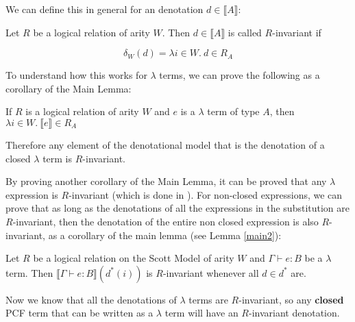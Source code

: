 We can define this in general for an denotation $d \in \llbracket A \rrbracket$:

\vspace{0.5cm}

\begin{defn}{\citep{Streicher06}}Let $R$ be a logical relation of arity $W$. Then $d \in \llbracket A \rrbracket$ is called $R$-invariant if 

\[\delta_W(d) = \lambda i \in W. \ d \in R_A \]
\end{defn}


To understand how this works for $\lambda$ terms, we can prove the following as a corollary of the Main Lemma:

\vspace{0.5cm}

\begin{cor}{\citep{Streicher06}}
If $R$ is a logical relation of arity $W$ and $e$ is a $\lambda$ term of type $A$, then $\lambda i \in W. \ \llbracket e \rrbracket \in R_A$
\end{cor}

Therefore any element of the denotational model that is the denotation of a closed $\lambda$ term is $R$-invariant.

By proving another corollary of the Main Lemma, it can be proved that any $\lambda$ expression is $R$-invariant (which is done in \citep{Streicher06}). For non-closed expressions, we can prove that as long as the denotations of all the expressions in the substitution are $R$-invariant, then the denotation of the entire non closed expression is also $R$-invariant, as a corollary of the main lemma (see Lemma \ref{main2}):

\vspace{0.5cm}

\begin{cor}{\citep{Streicher06}}
Let $R$ be a logical relation on the Scott Model of arity $W$ and $\Gamma \vdash e : B$ be a $\lambda$ term. Then $\llbracket \Gamma \vdash e : B \rrbracket(d^*(i))$ is $R$-invariant whenever all $d \in d^*$ are.
\end{cor}

Now we know that all the denotations of $\lambda$ terms are $R$-invariant, so any \textbf{closed} PCF term that can be written as a $\lambda$ term will have  an $R$-invariant denotation. 


